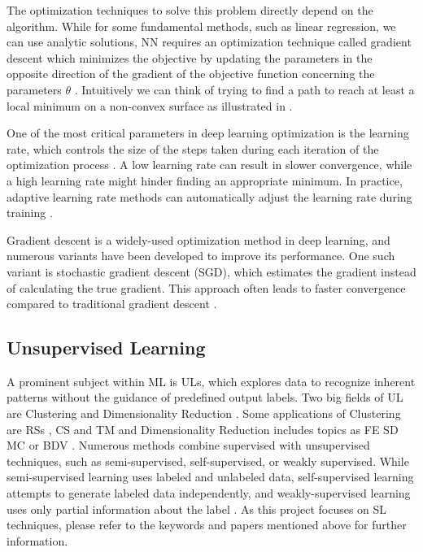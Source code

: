 The optimization techniques to solve this problem directly depend on the algorithm. While for some fundamental methods, such as linear regression, we can use analytic solutions, \ac{NN} requires an optimization technique called gradient descent which minimizes the objective by updating the parameters in the opposite direction of the gradient of the objective function concerning the parameters $\theta$ \cite{DBLP:journals/corr/Ruder16}. Intuitively we can think of trying to find a path to reach at least a local minimum on a non-convex surface as illustrated in .

One of the most critical parameters in deep learning optimization is the learning rate, which controls the size of the steps taken during each iteration of the optimization process \cite{goodfellow2016deep}. A low learning rate can result in slower convergence, while a high learning rate might hinder finding an appropriate minimum. In practice, adaptive learning rate methods can automatically adjust the learning rate during training \cite{DBLP:journals/corr/abs-1212-5701}.

Gradient descent is a widely-used optimization method in deep learning, and numerous variants have been developed to improve its performance. One such variant is stochastic gradient descent (SGD), which estimates the gradient instead of calculating the true gradient. This approach often leads to faster convergence compared to traditional gradient descent \cite{bottou2012stochastic}.

\subsection{Unsupervised Learning}
\label{subsec:unsupervised_learning}
A prominent subject within \ac{ML} is \acp{UL}, which explores data to recognize inherent patterns without the guidance of predefined output labels. Two big fields of \ac{UL} are Clustering \cite{mcgregor2004flow} and Dimensionality Reduction \cite{sorzano2014survey}. Some applications of Clustering are \acp{RS} \cite{lu2012recommender}, \ac{CS} \cite{shakya2021big} and \ac{TM} \cite{perlich2014machine} and Dimensionality Reduction includes topics as \ac{FE} \cite{boutilier2009online} \ac{SD} \cite{vogelstein2014discovery} \ac{MC} \cite{fevry2018unsupervised} or \ac{BDV} \cite{keim2013big}. Numerous methods combine supervised with unsupervised techniques, such as semi-supervised, self-supervised, or weakly supervised. While semi-supervised learning uses labeled and unlabeled data, self-supervised learning attempts to generate labeled data independently, and weakly-supervised learning uses only partial information about the label \cite{9442775}. As this project focuses on \ac{SL} techniques, please refer to the keywords and papers mentioned above for further information.

